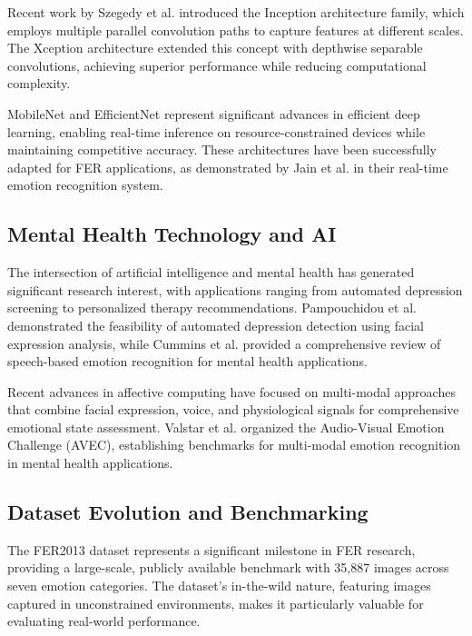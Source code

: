 \documentclass[conference]{IEEEtran}
\begin{document}
Recent work by Szegedy et al. \cite{szegedy2017inception} introduced the Inception architecture family, which employs multiple parallel convolution paths to capture features at different scales. The Xception architecture \cite{chollet2017xception} extended this concept with depthwise separable convolutions, achieving superior performance while reducing computational complexity.

MobileNet \cite{howard2017mobilenets} and EfficientNet \cite{tan2019efficientnet} represent significant advances in efficient deep learning, enabling real-time inference on resource-constrained devices while maintaining competitive accuracy. These architectures have been successfully adapted for FER applications, as demonstrated by Jain et al. \cite{jain2019real} in their real-time emotion recognition system.

\subsection{Mental Health Technology and AI}
The intersection of artificial intelligence and mental health has generated significant research interest, with applications ranging from automated depression screening to personalized therapy recommendations. Pampouchidou et al. \cite{pampouchidou2016automatic} demonstrated the feasibility of automated depression detection using facial expression analysis, while Cummins et al. \cite{cummins2015review} provided a comprehensive review of speech-based emotion recognition for mental health applications.

Recent advances in affective computing have focused on multi-modal approaches that combine facial expression, voice, and physiological signals for comprehensive emotional state assessment. Valstar et al. \cite{valstar2016avec} organized the Audio-Visual Emotion Challenge (AVEC), establishing benchmarks for multi-modal emotion recognition in mental health applications.

\subsection{Dataset Evolution and Benchmarking}
The FER2013 dataset \cite{goodfellow2013icml} represents a significant milestone in FER research, providing a large-scale, publicly available benchmark with 35,887 images across seven emotion categories. The dataset's in-the-wild nature, featuring images captured in unconstrained environments, makes it particularly valuable for evaluating real-world performance.
\end{document}

